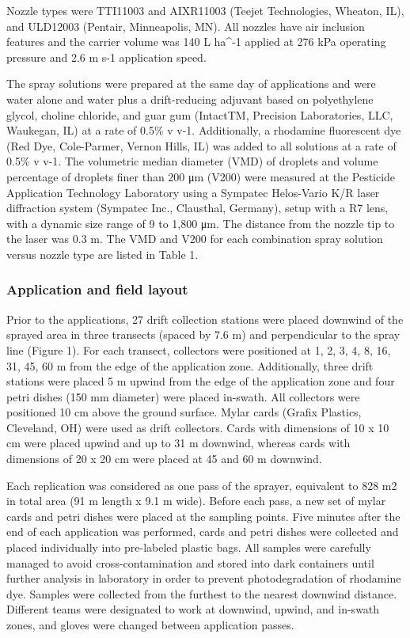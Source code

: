 \documentclass[
  12pt,
  a4paper,
]{article}
\begin{document}
Nozzle types were TTI11003 and AIXR11003 (Teejet Technologies, Wheaton,
IL), and ULD12003 (Pentair, Minneapolis, MN). All nozzles have air
inclusion features and the carrier volume was 140 L ha\^{}-1 applied at
276 kPa operating pressure and 2.6 m s-1 application speed.

The spray solutions were prepared at the same day of applications and
were water alone and water plus a drift-reducing adjuvant based on
polyethylene glycol, choline chloride, and guar gum (IntactTM, Precision
Laboratories, LLC, Waukegan, IL) at a rate of 0.5\% v v-1. Additionally,
a rhodamine fluorescent dye (Red Dye, Cole-Parmer, Vernon Hills, IL) was
added to all solutions at a rate of 0.5\% v v-1. The volumetric median
diameter (VMD) of droplets and volume percentage of droplets finer than
200 μm (V200) were measured at the Pesticide Application Technology
Laboratory using a Sympatec Helos-Vario K/R laser diffraction system
(Sympatec Inc., Clausthal, Germany), setup with a R7 lens, with a
dynamic size range of 9 to 1,800 μm. The distance from the nozzle tip to
the laser was 0.3 m. The VMD and V200 for each combination spray
solution versus nozzle type are listed in Table 1.

\hypertarget{application-and-field-layout}{%
\subsubsection{Application and field
layout}\label{application-and-field-layout}}

Prior to the applications, 27 drift collection stations were placed
downwind of the sprayed area in three transects (spaced by 7.6 m) and
perpendicular to the spray line (Figure 1). For each transect,
collectors were positioned at 1, 2, 3, 4, 8, 16, 31, 45, 60 m from the
edge of the application zone. Additionally, three drift stations were
placed 5 m upwind from the edge of the application zone and four petri
dishes (150 mm diameter) were placed in-swath. All collectors were
positioned 10 cm above the ground surface. Mylar cards (Grafix Plastics,
Cleveland, OH) were used as drift collectors. Cards with dimensions of
10 x 10 cm were placed upwind and up to 31 m downwind, whereas cards
with dimensions of 20 x 20 cm were placed at 45 and 60 m downwind.

Each replication was considered as one pass of the sprayer, equivalent
to 828 m2 in total area (91 m length x 9.1 m wide). Before each pass, a
new set of mylar cards and petri dishes were placed at the sampling
points. Five minutes after the end of each application was performed,
cards and petri dishes were collected and placed individually into
pre-labeled plastic bags. All samples were carefully managed to avoid
cross-contamination and stored into dark containers until further
analysis in laboratory in order to prevent photodegradation of rhodamine
dye. Samples were collected from the furthest to the nearest downwind
distance. Different teams were designated to work at downwind, upwind,
and in-swath zones, and gloves were changed between application passes.
\end{document}
